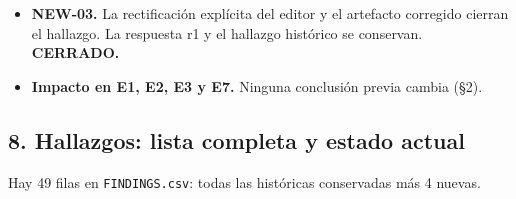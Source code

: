 \documentclass[
]{article}
\providecommand{\tightlist}{%
  \setlength{\itemsep}{0pt}\setlength{\parskip}{0pt}}
\begin{document}
\begin{itemize}
  \begin{itemize}
  \tightlist
  \item
    Cambian 18 páginas en raster (16, 18, 20, 21, 35, 55, 56, 61--71);
    coincide con la lista del editor.
  \item
    Revisé las 73 páginas. Las páginas 55, 56 y 61--71 se compararon
    además lado a lado r1\textbar r2, revisando los desplazamientos; no
    hay texto perdido ni duplicado, y las referencias siguen empezando
    en p. 72.
  \item
    Las comparaciones r1\textbar r2 de las páginas 16, 18, 20, 21 y 35
    no llegaron a mostrarse (C3-02). Esas páginas se verificaron en las
    hojas r2 y, la 35, también a 140 dpi.
  \end{itemize}
\item
  \textbf{NEW-03.} La rectificación explícita del editor y el artefacto
  corregido cierran el hallazgo. La respuesta r1 y el hallazgo histórico
  se conservan. \textbf{CERRADO.}
\item
  \textbf{Impacto en E1, E2, E3 y E7.} Ninguna conclusión previa cambia
  (§2).
\end{itemize}

\subsection{8. Hallazgos: lista completa y estado
actual}\label{8-hallazgos-lista-completa-y-estado-actual}

Hay 49 filas en \texttt{FINDINGS.csv}: todas las históricas conservadas
más 4 nuevas.
\end{document}
